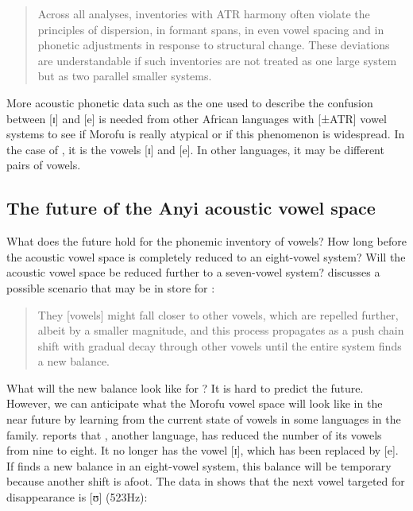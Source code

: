 \documentclass[output=paper,
modfonts
]{langscibook}
\begin{document}
\begin{quote}
{Across all analyses, inventories with ATR harmony often violate the principles of dispersion, in formant spans, in even vowel spacing and in phonetic adjustments in response to structural change. These deviations are understandable if such inventories are not treated as one large system but as two parallel smaller systems.}
\end{quote}

{More acoustic phonetic data such as the one used to describe the confusion between [ɪ] and [e] is needed from other African languages with [±ATR] vowel systems to see if  Morofu is really atypical or if this phenomenon is widespread. In the case of , it is the vowels [ɪ] and [e]. In other languages, it may be different pairs of vowels.} 

\subsection{The future of the Anyi acoustic vowel space}
What does the future hold for the phonemic inventory of  vowels? How long before the acoustic vowel space is completely reduced to an eight-vowel system? Will the acoustic vowel space be reduced further to a seven-vowel system? \citet[113]{Becker-Kristal2010} discusses a possible scenario that may be in store for :

\begin{quote}
{They [vowels] might fall closer to other vowels, which are repelled further, albeit by a smaller magnitude, and this process propagates as a push chain shift with gradual decay through other vowels until the entire system finds a new balance.}
\end{quote}

{What will the new balance look like for ? It is hard to predict the future. However, we can anticipate what the  Morofu vowel space will look like in the near future by learning from the current state of vowels in some languages in the  family. \citet[430]{Mensah1983} reports that , another  language, has reduced the number of its vowels from nine to eight. It no longer has the vowel [ɪ], which has been replaced by [e]. If  finds a new balance in an eight-vowel system, this balance will be temporary because another shift is afoot. The data in  shows that the next vowel targeted for disappearance is [ʊ] (523Hz):}
\end{document}
